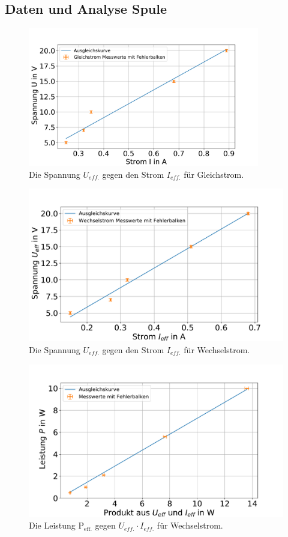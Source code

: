 
\subsection{Daten und Analyse Spule}\label{kap:Spule}

\FloatBarrier


\begin{figure}[h]
	\centering
	\includegraphics[width=0.9\textwidth]{res/UgegenI_GL.pdf}
	\caption{Die Spannung $U_{eff.}$ gegen den Strom $I_{eff.}$ für Gleichstrom.}
	\label{fig:UgegenIgl}
\end{figure}
\begin{figure}
	\centering
	\includegraphics[width=0.9\linewidth]{res/UgegenI_W.pdf}
	\caption{Die Spannung $U_{eff.}$ gegen den Strom $I_{eff.}$ für Wechselstrom.}
	\label{fig:UgegenIw}
\end{figure}
\begin{figure}
	\centering
	\includegraphics[width=0.9\linewidth]{res/PgegenUI.pdf}
	\caption{Die Leistung P$_\text{eff.}$ gegen $U_{eff.} \cdot I_{eff.}$ für Wechselstrom.}
	\label{fig:PgegenUI}
\end{figure}
